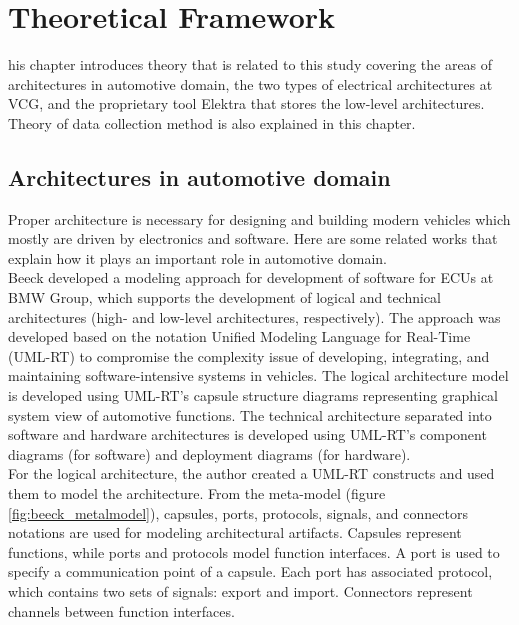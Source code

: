 \chapter{Theoretical Framework}

\lettrine[findent=2pt]{}{ }his chapter introduces theory that is related to this study covering the areas of architectures in automotive domain, the two types of electrical architectures at VCG, and the proprietary tool Elektra that stores the low-level architectures. Theory of data collection method is also explained in this chapter.


\section{Architectures in automotive domain}
Proper architecture is necessary for designing and building modern vehicles which mostly are driven by electronics and software. Here are some related works that explain how it plays an important role in automotive domain.\\

Beeck \cite{Beeck} developed a modeling approach for development of software for ECUs at BMW Group, which supports the development of logical and technical architectures (high- and low-level architectures, respectively). The approach was developed based on the notation Unified Modeling Language for Real-Time (UML-RT) to compromise the complexity issue of developing, integrating, and maintaining software-intensive systems in vehicles. The logical architecture model is developed using UML-RT's capsule structure diagrams representing graphical system view of automotive functions. The technical architecture separated into software and hardware architectures is developed using UML-RT's component diagrams (for software) and deployment diagrams (for hardware). \\

For the logical architecture, the author created a UML-RT constructs and used them to model the architecture. From the meta-model (figure \ref{fig:beeck_metalmodel}), capsules, ports, protocols, signals, and connectors notations are used for modeling architectural artifacts. Capsules represent functions, while ports and protocols model function interfaces. A port is used to specify a communication point of a capsule. Each port has associated protocol, which contains two sets of signals: export and import. Connectors represent channels between function interfaces. \\

